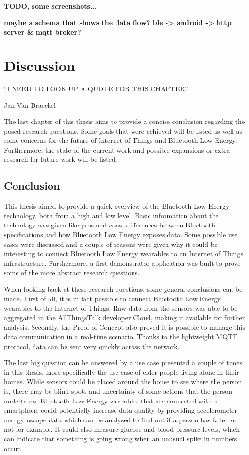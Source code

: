\documentclass[pdftex,a4paper,12pt,twoside]{report}
\begin{document}
\textbf{TODO, some screenshots...}

\textbf{maybe a schema that shows the data flow? ble -> android -> http server \& mqtt broker?}

\chapter{Discussion}
\label{ch:discussion}
\epigraph{``I NEED TO LOOK UP A QUOTE FOR THIS CHAPTER''}{Jan Van Braeckel}
The last chapter of this thesis aims to provide a concise conclusion regarding the posed research questions. Some goals that were achieved will be listed as well as some concerns for the future of Internet of Things and Bluetooth Low Energy. Furthermore, the state of the current work and possible expansions or extra research for future work will be listed.

\section{Conclusion}
\label{sec:conclusion}
This thesis aimed to provide a quick overview of the Bluetooth Low Energy technology, both from a high and low level. Basic information about the technology was given like pros and cons, differences between Bluetooth specifications and how Bluetooth Low Energy exposes data. Some possible use cases were discussed and a couple of reasons were given why it could be interesting to connect Bluetooth Low Energy wearables to an Internet of Things infrastructure. Furthermore, a first demonstrator application was built to prove some of the more abstract research questions.

When looking back at these research questions, some general conclusions can be made. First of all, it is in fact possible to connect Bluetooth Low Energy wearables to the Internet of Things. Raw data from the sensors was able to be aggregated in the AllThingsTalk developer Cloud, making it available for further analysis. Secondly, the Proof of Concept also proved it is possible to manage this data communication in a real-time scenario. Thanks to the lightweight MQTT protocol, data can be sent very quickly across the network.

The last big question can be answered by a use case presented a couple of times in this thesis, more specifically the use case of elder people living alone in their homes. While sensors could be placed around the house to see where the person is, there may be blind spots and uncertainty of some actions that the person undertakes. Bluetooth Low Energy wearables that are connected with a smartphone could potentially increase data quality by providing accelerometer and gyroscope data which can be analysed to find out if a person has fallen or not for example. It could also measure glucose and blood pressure levels, which can indicate that something is going wrong when an unusual spike in numbers occur.
\end{document}

